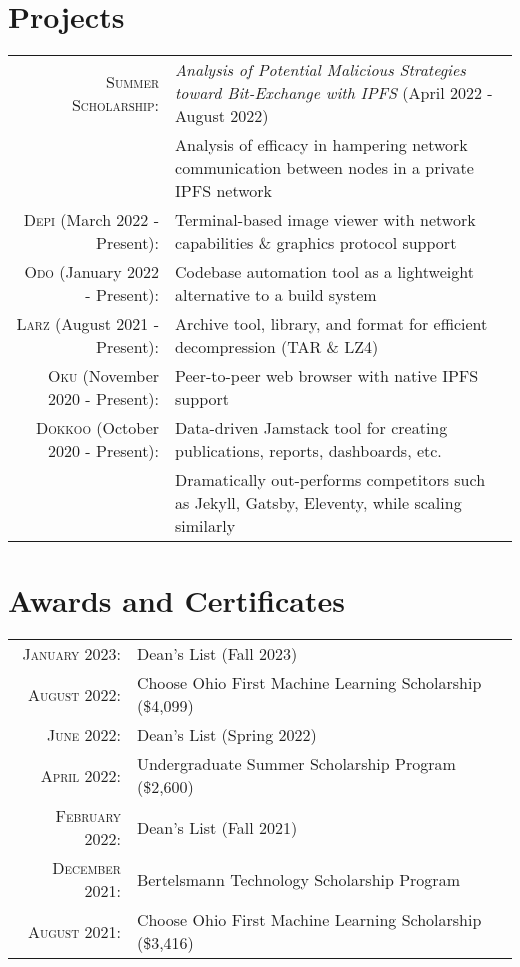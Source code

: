 \documentclass[letterpaper,8pt]{article} %
\begin{document}
\section{Projects}

\begin{tabular}{rl}
\footnotesize\textsc{Summer Scholarship}: & \footnotesize\emph{Analysis of Potential Malicious Strategies toward Bit-Exchange with IPFS} \footnotesize{(April 2022 - August 2022)}\\
& \footnotesize{Analysis of efficacy in hampering network communication between nodes in a private IPFS network}\\
\textsc{Depi} \footnotesize{(March 2022 - Present)}: & \footnotesize{Terminal-based image viewer with network capabilities \& graphics protocol support}\\
\textsc{Odo} \footnotesize{(January 2022 - Present)}: & \footnotesize{Codebase automation tool as a lightweight alternative to a build system}\\
\textsc{Larz} \footnotesize{(August 2021 - Present)}: & \footnotesize{Archive tool, library, and format for efficient decompression (TAR \& LZ4)}\\
\textsc{Oku} \footnotesize{(November 2020 - Present)}: & \footnotesize{Peer-to-peer web browser with native IPFS support}\\
\textsc{Dokkoo} \footnotesize{(October 2020 - Present)}: & \footnotesize{Data-driven Jamstack tool for creating publications, reports, dashboards, etc.}\\
& \footnotesize{Dramatically out-performs competitors such as Jekyll, Gatsby, Eleventy, while scaling similarly}
\end{tabular}


\section{Awards and Certificates}

\footnotesize{\begin{tabular}{rl}
\textsc{January 2023}: & Dean's List (Fall 2023)\\
\textsc{August 2022}: & Choose Ohio First Machine Learning Scholarship \footnotesize(\$4,099)\normalsize\\
\textsc{June 2022}: & Dean's List (Spring 2022)\\
\textsc{April 2022}: & Undergraduate Summer Scholarship Program \footnotesize(\$2,600)\\
\textsc{February 2022}: & Dean's List (Fall 2021)\\
\textsc{December 2021}: & Bertelsmann Technology Scholarship Program\\
\textsc{August 2021}: & Choose Ohio First Machine Learning Scholarship \footnotesize(\$3,416)\normalsize\\
\end{tabular}}\normalsize
\end{document}
